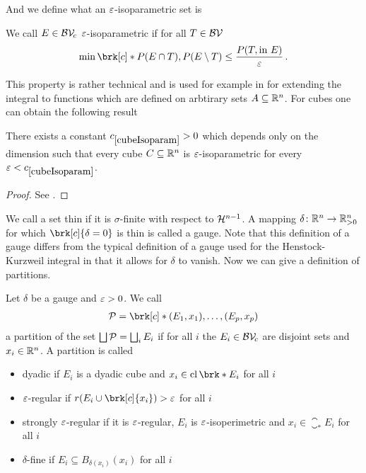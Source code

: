 And we define what an $\e$-isoparametric set is

\begin{definition}[$\e$-isoparametric]
We call $E\in\mathcal{BV\!}_c$ $\e$-isoparametric if for all $T\in\mathcal{BV\!}$
\begin{align*}
	\min\brk[c]*{P(E\cap T),P(E\setminus T)}\leq \frac{P(T,\text{in }E)}{\e}\,.
\end{align*}
\end{definition}

This property is rather technical and is used for example in \cite[Definition 3.11]{Pfe2016} for extending the integral to functions which are defined on arbtirary sets $A\subseteq \mathbb{R}^n$.
For cubes one can obtain the following result

\begin{proposition}
There exists a constant $\useconstant{cubeIsoparam}>0$ which depends only on the dimension such that every cube $C\subseteq\mathbb{R}^n$ is $\e$-isoparametric for every $\e<\useconstant{cubeIsoparam}$.
\end{proposition}
\begin{proof}
See \cite[Lemma 3.1]{Pfe2016}.
\end{proof}

We call a set thin if it is $\sigma$-finite with respect to $\mathcal{H}^{n-1}$. A mapping $\delta\colon\mathbb{R}^n\to\mathbb{R}^n_{>0}$ for which $\brk[c]{\delta=0}$ is thin is called a gauge. Note that this definition of a gauge differs from the typical definition of a gauge used for the Henstock-Kurzweil integral in that it allows for $\delta$ to vanish.
Now we can give a definition of partitions.

\begin{definition}[Partitions]
Let $\delta$ be a gauge and $\varepsilon>0$.
We call
\begin{align*}
	\cP=\brk[c]*{(E_1,x_1),\dots, (E_p,x_p)}
\end{align*}
a partition of the set $\bigsqcup\mathcal{P}=\bigsqcup_iE_i$ if for all $i$ the $E_i\in\mathcal{BV\!}_c$ are disjoint sets and $x_i\in\mathbb{R}^n$. A partition is called
\begin{itemize}
	\item dyadic if $E_i$ is a dyadic cube and $x_i\in \closure\brk*{E_i}$ for all $i$
	\item $\e$-regular if $r(E_i\cup\brk[c]{x_i})>\e$ for all $i$
	\item strongly $\e$-regular if it is $\e$-regular, $E_i$ is $\e$-isoperimetric and $x_i\in\closure_*E_i$ for all $i$
	\item $\delta$-fine if $E_i\subseteq B_{\delta(x_i)}(x_i)$ for all $i$
\end{itemize}
\end{definition}


